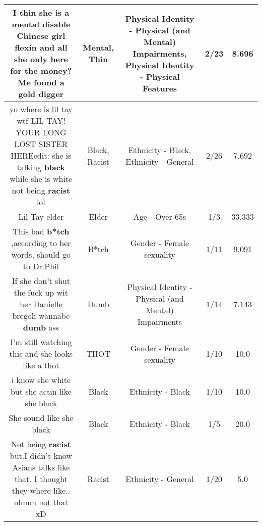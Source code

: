 \documentclass[11pt]{article}
\newlength\mylength
\begin{document}
\begin{center}
\begin{longtable}{|C{.65\mylength}|C{.30\mylength}|C{.12\mylength}|C{.12\mylength}|C{.12\mylength}|}
  \small I \textbf{thin} she is a \textbf{mental} disable Chinese girl flexin and all she only here for the money? Me found a gold digger\normalsize   & Mental, Thin & Physical Identity - Physical (and Mental) Impairments, Physical Identity - Physical Features & 2/23 & 8.696 \\  \hline
  \small yo where is lil tay wtf LIL TAY! YOUR LONG LOST SISTER HEREedit: she is talking \textbf{black} while she is white not being \textbf{racist} lol\normalsize   & Black, Racist & Ethnicity - Black, Ethnicity - General & 2/26 & 7.692 \\  \hline
  \small Lil Tay elder\normalsize   & Elder & Age - Over 65s & 1/3 & 33.333 \\  \hline
  \small This bad \textbf{b*tch} ,according to her words, should go to Dr.Phil\normalsize   & B*tch & Gender - Female sexuality & 1/11 & 9.091 \\  \hline
  \small If she don't shut the fuck up wit her Danielle bregoli wannabe \textbf{dumb} ass\normalsize   & Dumb & Physical Identity - Physical (and Mental) Impairments & 1/14 & 7.143 \\  \hline
  \small I'm still watching this and she looks like a thot\normalsize   & THOT & Gender - Female sexuality & 1/10 & 10.0 \\  \hline
  \small i know she white but she actin like she black\normalsize   & Black & Ethnicity - Black & 1/10 & 10.0 \\  \hline
  \small She sound like she black\normalsize   & Black & Ethnicity - Black & 1/5 & 20.0 \\  \hline
  \small Not being \textbf{racist} but.I didn't know Asians talks like that. I thought they where like.. uhmm not that xD\normalsize   & Racist & Ethnicity - General & 1/20 & 5.0 \\  \hline

\end{longtable}
\end{center}
\end{document}
